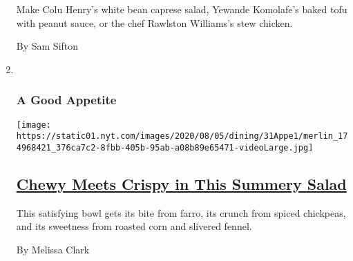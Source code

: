 \begin{enumerate}
  Make Colu Henry's white bean caprese salad, Yewande Komolafe's baked
  tofu with peanut sauce, or the chef Rawlston Williams's stew chicken.

  By Sam Sifton
\item ~
  \hypertarget{a-good-appetite}{%
  \subsubsection{A Good Appetite}\label{a-good-appetite}}

  \texttt{[image: https://static01.nyt.com/images/2020/08/05/dining/31Appe1/merlin\_174968421\_376ca7c2-8fbb-405b-95ab-a08b89e65471-videoLarge.jpg]}

  \hypertarget{chewy-meets-crispy-in-this-summery-salad}{%
  \subsection{\texorpdfstring{\href{/2020/07/31/dining/farro-corn-chickpea-salad-recipe.html}{Chewy
  Meets Crispy in This Summery
  Salad}}{Chewy Meets Crispy in This Summery Salad}}\label{chewy-meets-crispy-in-this-summery-salad}}

  This satisfying bowl gets its bite from farro, its crunch from spiced
  chickpeas, and its sweetness from roasted corn and slivered fennel.

  By Melissa Clark
\end{enumerate}

